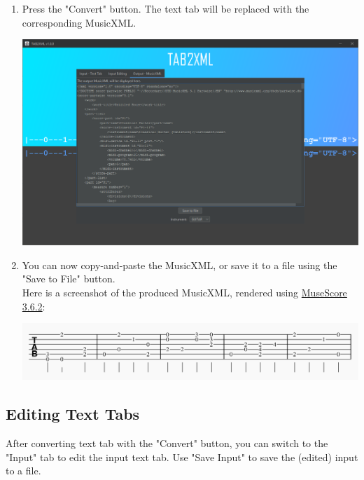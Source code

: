 \documentclass[11pt]{article}
\begin{document}
\begin{enumerate}
\begin{center}
\end{center}
\item Press the "Convert" button.  The text tab will be replaced with the corresponding MusicXML.
\begin{center}
\includegraphics[width=.9\linewidth]{../Screenshots/converted-20210413-tabbedview.png}
\end{center}
\item You can now copy-and-paste the MusicXML, or save it to a file using the "Save to File" button. \\
Here is a screenshot of the produced MusicXML, rendered using \href{https://musescore.org/en/download}{MuseScore 3.6.2}:
\begin{center}
\includegraphics[width=.9\linewidth]{../Screenshots/converted-20210413-musescore.png}
\end{center}
\end{enumerate}
\subsection{Editing Text Tabs}
\label{sec:org46031c0}
After converting text tab with the "Convert" button, you can switch to the "Input" tab to edit the input text tab.  Use "Save Input" to save the (edited) input to a file.
\end{document}
